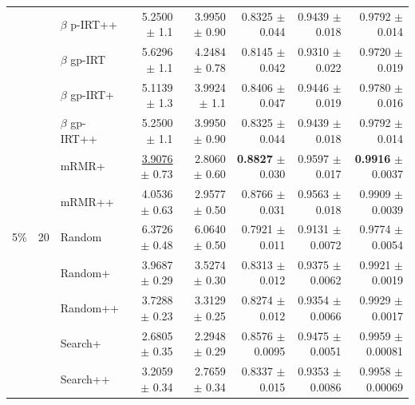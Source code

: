 \begin{longtable}{llp{}rrrrr}
 &  & $\beta$ p-IRT++ & 5.2500 {\scriptsize $\pm$ 1.1} & 3.9950 {\scriptsize $\pm$ 0.90} & 0.8325 {\scriptsize $\pm$ 0.044} & 0.9439 {\scriptsize $\pm$ 0.018} & 0.9792 {\scriptsize $\pm$ 0.014} \\
 &  & $\beta$ gp-IRT & 5.6296 {\scriptsize $\pm$ 1.1} & 4.2484 {\scriptsize $\pm$ 0.78} & 0.8145 {\scriptsize $\pm$ 0.042} & 0.9310 {\scriptsize $\pm$ 0.022} & 0.9720 {\scriptsize $\pm$ 0.019} \\
 &  & $\beta$ gp-IRT+ & 5.1139 {\scriptsize $\pm$ 1.3} & 3.9924 {\scriptsize $\pm$ 1.1} & 0.8406 {\scriptsize $\pm$ 0.047} & 0.9446 {\scriptsize $\pm$ 0.019} & 0.9780 {\scriptsize $\pm$ 0.016} \\
 &  & $\beta$ gp-IRT++ & 5.2500 {\scriptsize $\pm$ 1.1} & 3.9950 {\scriptsize $\pm$ 0.90} & 0.8325 {\scriptsize $\pm$ 0.044} & 0.9439 {\scriptsize $\pm$ 0.018} & 0.9792 {\scriptsize $\pm$ 0.014} \\
 &  & mRMR+ & \underline{3.9076} {\scriptsize $\pm$ 0.73} & 2.8060 {\scriptsize $\pm$ 0.60} & \textbf{0.8827} {\scriptsize $\pm$ 0.030} & 0.9597 {\scriptsize $\pm$ 0.017} & \textbf{0.9916} {\scriptsize $\pm$ 0.0037} \\
 &  & mRMR++ & 4.0536 {\scriptsize $\pm$ 0.63} & 2.9577 {\scriptsize $\pm$ 0.50} & 0.8766 {\scriptsize $\pm$ 0.031} & 0.9563 {\scriptsize $\pm$ 0.018} & 0.9909 {\scriptsize $\pm$ 0.0039} \\
\midrule
5\% & 20 & Random & 6.3726 {\scriptsize $\pm$ 0.48} & 6.0640 {\scriptsize $\pm$ 0.50} & 0.7921 {\scriptsize $\pm$ 0.011} & 0.9131 {\scriptsize $\pm$ 0.0072} & 0.9774 {\scriptsize $\pm$ 0.0054} \\
 &  & Random+ & 3.9687 {\scriptsize $\pm$ 0.29} & 3.5274 {\scriptsize $\pm$ 0.30} & 0.8313 {\scriptsize $\pm$ 0.012} & 0.9375 {\scriptsize $\pm$ 0.0062} & 0.9921 {\scriptsize $\pm$ 0.0019} \\
 &  & Random++ & 3.7288 {\scriptsize $\pm$ 0.23} & 3.3129 {\scriptsize $\pm$ 0.25} & 0.8274 {\scriptsize $\pm$ 0.012} & 0.9354 {\scriptsize $\pm$ 0.0066} & 0.9929 {\scriptsize $\pm$ 0.0017} \\
 &  & Search+ & 2.6805 {\scriptsize $\pm$ 0.35} & 2.2948 {\scriptsize $\pm$ 0.29} & 0.8576 {\scriptsize $\pm$ 0.0095} & 0.9475 {\scriptsize $\pm$ 0.0051} & 0.9959 {\scriptsize $\pm$ 0.00081} \\
 &  & Search++ & 3.2059 {\scriptsize $\pm$ 0.34} & 2.7659 {\scriptsize $\pm$ 0.34} & 0.8337 {\scriptsize $\pm$ 0.015} & 0.9353 {\scriptsize $\pm$ 0.0086} & 0.9958 {\scriptsize $\pm$ 0.00069} \\

\end{longtable}
